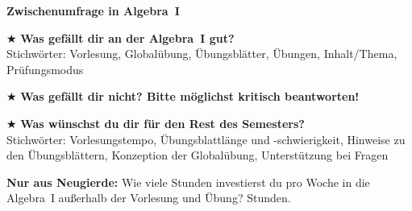 \documentclass[12pt,a4paper,ngerman]{scrartcl}
\newcommand{\quest}[1]{$\bigstar$ #1 \vfill}
\newcommand{\neugierde}[1]{\textbf{Nur aus Neugierde:} #1}
\begin{document}
\begin{center}\Large\textbf{Zwischenumfrage in Algebra~I}\end{center}

\large

\quest{\textbf{Was gefällt dir an der Algebra~I gut?} \\
Stichwörter: Vorlesung, Globalübung, Übungsblätter, Übungen, Inhalt/Thema,
Prüfungsmodus}

\hrulefill

\quest{\textbf{Was gefällt dir nicht? Bitte möglichst kritisch beantworten!}}

\hrulefill

\quest{\textbf{Was wünschst du dir für den Rest des Semesters?} \\
Stichwörter: Vorlesungstempo, Übungsblattlänge und -schwierigkeit,
Hinweise zu den Übungsblättern, Konzeption der Globalübung, Unterstützung bei Fragen}

\hrulefill

\neugierde{{Wie viele Stunden investierst du pro Woche in die
Algebra~I außerhalb der Vorlesung und Übung?}}
\underline{\quad\qquad} Stunden.
\end{document}
